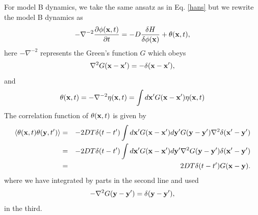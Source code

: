 For model B dynamics, we take the same ansatz as in Eq. \eqref{hans} but we rewrite the model B dynamics as
\begin{equation}
-\nabla^{-2} \frac{\partial\phi({\bf x},t)}{\partial t} = -D \frac{\delta H}{\delta \phi({\bf x})}+ 
\theta({\bf x},t),
\end{equation}
here $-\nabla^{-2}$ represents the Green's function $G$ which obeys 
\begin{equation}
\nabla^2 G({\bf x}-{\bf x'}) = -\delta({\bf x}-{\bf x}'),
\end{equation}
and 
\begin{equation}
\theta({\bf x},t)=-\nabla^{-2}\eta({\bf x},t)= \int d{\bf x}'G({\bf x}-{\bf x'})\eta({\bf x},t)
\end{equation}
The correlation function of $\theta({\bf x},t)$ is given by
\begin{eqnarray}
\langle \theta({\bf x},t)\theta({\bf y},t')\rangle &=&-2DT\delta(t-t') \int d{\bf x}'G({\bf x}-{\bf x'})d{\bf y}'G({\bf y}-{\bf y'})\nabla^2\delta({\bf x}'-{\bf y}') \\
&=& -2DT\delta(t-t') \int d{\bf x}'G({\bf x}-{\bf x'})d{\bf y}'\nabla^2G({\bf y}-{\bf y'})\delta({\bf x}'-{\bf y}') \\
&=& 2DT\delta(t-t') G({\bf x}-{\bf y}).
\end{eqnarray}
where we have integrated by parts in the second line and used 
\begin{equation}
-\nabla^2G({\bf y}-{\bf y'})= \delta({\bf y}-{\bf y}'),
\end{equation}
in the third.

